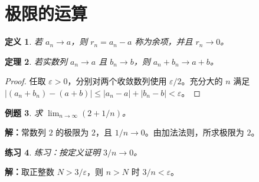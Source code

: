 \documentclass[UTF8,fontset=fandol,11pt]{ctexart}
\newtheorem{definition}{定义}[section]
\newtheorem{theorem}[definition]{定理}
\newtheorem{example}[definition]{例题}
\newtheorem{exercise}[definition]{练习}
\begin{document}
\section{极限的运算}
\begin{definition}
若 $a_n\to a$，则 $r_n=a_n-a$ 称为余项，并且 $r_n\to0$。
\end{definition}
\begin{theorem}
若实数列 $a_n\to a$ 且 $b_n\to b$，则 $a_n+b_n\to a+b$。
\end{theorem}
\begin{proof}
任取 $\varepsilon>0$，分别对两个收敛数列使用 $\varepsilon/2$。充分大的 $n$ 满足 $|(a_n+b_n)-(a+b)|\leq |a_n-a|+|b_n-b|<\varepsilon$。
\end{proof}
\begin{example}
求 $\lim_{n\to\infty}(2+1/n)$。
\end{example}
\par\noindent\textbf{解：}常数列 $2$ 的极限为 $2$，且 $1/n\to0$。由加法法则，所求极限为 $2$。\par
\begin{exercise}
练习：按定义证明 $3/n\to0$。
\end{exercise}
\par\noindent\textbf{解：}取正整数 $N>3/\varepsilon$，则 $n>N$ 时 $3/n<\varepsilon$。\par
\end{document}
